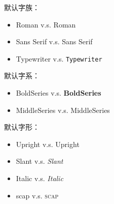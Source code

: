 \documentclass{ctexart}
\begin{document}
            默认字族：\familydefault %
            \begin{itemize}
                \item Roman v.s. \textrm{Roman} %
                \item Sans Serif v.s. \textsf{Sans Serif} %
                \item Typewriter v.s. \texttt{Typewriter} %
            \end{itemize}
        
            默认字系：\seriesdefault %
            \begin{itemize}
                \item BoldSeries v.s. \textbf{BoldSeries} %
                \item MiddleSeries v.s. \textmd{MiddleSeries} %
            \end{itemize}

            默认字形：\shapedefault 
            \begin{itemize}
                \item Upright v.s. \textup{Upright} %
                \item Slant v.s. \textsl{Slant} %
                \item Italic v.s. \textit{Italic} %
                \item scap v.s. \textsc{scap} %
            \end{itemize}

\end{document}

